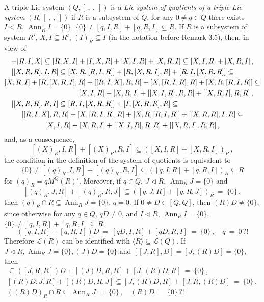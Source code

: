 \documentclass[a4paper,11pt]{article}
\DeclareMathOperator{\Ann}{Ann}
\begin{document}
A triple Lie system ${(Q, [\ ,\ ,\ ])}$ is a \emph{Lie system of quotients of 
a triple Lie system} ${(R, [\ ,\ ,\ ])}$ if $R$ is a subsystem of $Q$, 
for any ${0\ne q\in Q}$ there exists ${I\lhd R}$, ${\Ann_R I=\{0\}}$, 
$\{0\}\ne [q, I, R]+[q, R, I]\subseteq R$. If $R$ is a subsystem of system 
$R'$, ${X, I\subseteq R'}$, ${(I)_R\subseteq I}$ (in the notation before 
Remark 3.5), then, in view of 
\begin{multline*}
[I, R, X]+[R, I, X]\subseteq [R, X, I]+[I, X, R]+[X, I, R]+[X, R, I]\subseteq 
[X, I, R]+[X, R, I]\,,
\\
\shoveleft{
[[X, R, R], I, R]\subseteq 
[X, R, [R, I, R]]+[R, [X, R, I], R]+[R, I, [X, R, R]]\subseteq} 
\\
[X, R, I]+[R, [X, R, I], R]+[[R, I, X], R, R]+[X, [R, I, R], R]+
[X, R, [R, I, R]]\subseteq
\\
\shoveright{ 
[X, I, R]+[X, R, I]+[[X, I, R], R, R]+[[X, R, I], R, R]\,,}
\\
\shoveleft{
[[X, R, R], R, I]\subseteq [R, I, [X, R, R]]+[I, [X, R, R], R]\subseteq}
\\
[[R, I, X], R, R]+[X, [R, I, R], R]+[X, R, [R, I, R]]+
[[X, R, R], I, R]\subseteq
\\
[X, I, R]+[X, R, I]+[[X, I, R], R, R]+[[X, R, I], R, R]\,,
\end{multline*}
and, as a consequence, 
\[
[(X)_R, I, R]+[(X)_R, R, I]\subseteq ([X, I, R]+[X, R, I])_R\,,
\] 
the condition in the definition of the system of quotients is equivalent to 
\[
\{0\}\ne [(q)_R, I, R]+[(q)_R, R, I]\subseteq 
([q, I, R]+[q, R, I])_R\subseteq R
\]
for ${(q)_R=q M^Q(R)'}$. Moreover, if ${q\in Q}$, ${J\lhd R}$, 
${\Ann_R J=\{0\}}$ and 
\[
[(q)_R, J, R]+[(q)_R, R, J]\subseteq ([q, J, R]+[q, R, J])_R\ =\ \{0\}\,,
\]
then ${(q)_R\cap R\subseteq \Ann_R J=\{0\}}$, ${q=0}$. If ${0\ne D\in [Q, Q]}$, 
then ${(R)D\ne \{0\}}$, since otherwise for any ${q\in Q}$, 
${q D\ne 0}$, and ${I\lhd R}$, ${\Ann_R I=\{0\}}$, 
${\{0\}\ne [q, I, R]+[q, R, I]\subseteq R}$, 
\[
([q, I, R]+[q, R, I])D\ =\ [q D, I, R]+[q D, R, I]\ =\ \{0\}\,,\quad 
q\ =\ 0\,?!
\]
Therefore $\mathcal{L}(R)$ can be identified with 
${\langle R\rangle\subseteq \mathcal{L}(Q)}$.
If ${J\lhd R, \Ann_R J=\{0\}, (J)D=\{0\}}$ and  
${[[J, R], D]=[J, (R)D]=\{0\}}$, then  
\begin{gather*}
[J, R, (R)D]\subseteq ([J, R, R])D+[(J)D, R, R]+[J, (R)D, R]\ =\ \{0\}\,,
\\
[(R)D, J, R]+[(R)D, R, J]\subseteq [J, (R)D, R]+[J, R, (R)D]\ =\ \{0\}\,,
\\
((R)D)_R\cap R\subseteq \Ann_R J\ =\ \{0\}\,,\quad (R)D\ =\ \{0\}\,?!
\end{gather*}
\end{document}

